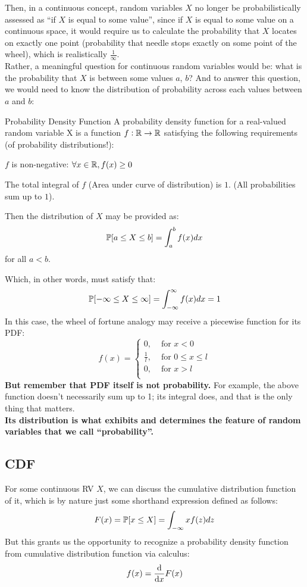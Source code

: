 Then, in a continuous concept, random variables $X$ no longer be probabilistically assessed as ``if $X$ is equal to some value'', since if $X$ is equal to some value on a continuous space, it would require us to calculate the probability that $X$ locates on exactly one point (probability that needle stops exactly on some point of the wheel), which is realistically $\frac{1}{\infty}$. \\
Rather, a meaningful question for continuous random variables would be: what is the probability that $X$ is between some values $a$, $b$? And to answer this question, we would need to know the distribution of probability across each values between $a$ and $b$:
\begin{ln-define}{Probability Density Function}{}
    A probability density function for a real-valued random variable X is a function $f: \R \rightarrow \R$ satisfying the following requirements (of probability distributions!):
    \begin{bindenum}
        \item $f$ is non-negative: $\forall x \in \R, f(x) \geq 0$
        \item The total integral of $f$ (Area under curve of distribution) is $1$. (All probabilities sum up to $1$).
    \end{bindenum}
    Then the distribution of $X$ may be provided as:
    \[
        \P[a \leq X \leq b] = \int_a^b f(x) dx
    \]
    for all $a < b$.
\end{ln-define}
Which, in other words, must satisfy that:
\[
    \P[-\infty \leq X \leq \infty] = \int_{-\infty}^{\infty} f(x) dx = 1
\]
In this case, the wheel of fortune analogy may receive a piecewise function for its PDF:
\[
    f(x) = 
    \begin{cases}
        0, &\text{ for $x < 0$} \\
        \frac{1}{l}, &\text{ for $0 \leq x \leq l$} \\
        0, &\text{ for $x > l$} \\
    \end{cases}
\]
\textbf{But remember that PDF itself is not probability.} For example, the above function doesn't necessarily sum up to 1; its integral does, and that is the only thing that matters. \\
\textbf{Its distribution is what exhibits and determines the feature of random variables that we call ``probability''.}

\subsection{CDF}
For some continuous RV $X$, we can discuss the cumulative distribution function of it, which is by nature just some shorthand expression defined as follows:
\[
    F(x) = \P[x \leq X] = \int_{-\infty}{x} f(z) dz
\]
But this grants us the opportunity to recognize a probability density function from cumulative distribution function via calculus:
\[
    f(x) = \dv{}{x} F(x)
\]

